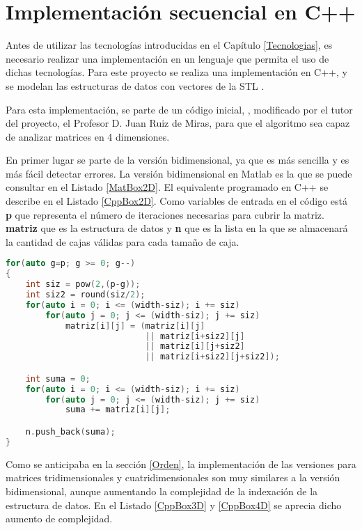 \chapter{Implementación secuencial en C++}
\label{Secuencial}
Antes de utilizar las tecnologías introducidas en el Capítulo \ref{Tecnologias}, es necesario realizar una implementación en un lenguaje que permita el uso de dichas tecnologías. Para este proyecto se realiza una implementación en C++, y se modelan las estructuras de datos con vectores de la STL \cite{unknown-author-no-dateH}.

Para esta implementación, se parte de un código inicial, \cite{unknown-author-2008}, modificado por el tutor del proyecto, el Profesor D. Juan Ruiz de Miras, para que el algoritmo sea capaz de analizar matrices en 4 dimensiones.



En primer lugar se parte de la versión bidimensional, ya que es más sencilla y es más fácil detectar errores. La versión bidimensional en Matlab es la que se puede consultar en el Listado \ref{MatBox2D}. El equivalente programado en C++ se describe en el Listado \ref{CppBox2D}. Como variables de entrada en el código está \textbf{p} que representa el número de iteraciones necesarias para cubrir la matriz. \textbf{matriz} que es la estructura de datos y \textbf{n} que es la lista en la que se almacenará la cantidad de cajas válidas para cada tamaño de caja.
\newpage
\begin{lstlisting}[language=C++,caption={Primera versión del Boxcount2D programado en C++},label=CppBox2D]
for(auto g=p; g >= 0; g--)
{
    int siz = pow(2,(p-g));
    int siz2 = round(siz/2);
    for(auto i = 0; i <= (width-siz); i += siz)
        for(auto j = 0; j <= (width-siz); j += siz)
            matriz[i][j] = (matriz[i][j] 
                            || matriz[i+siz2][j] 
                            || matriz[i][j+siz2] 
                            || matriz[i+siz2][j+siz2]);

    int suma = 0; 
    for(auto i = 0; i <= (width-siz); i += siz)
        for(auto j = 0; j <= (width-siz); j += siz)
            suma += matriz[i][j];

    n.push_back(suma);
}
\end{lstlisting}

\newpage

Como se anticipaba en la sección \ref{Orden}, la implementación de las versiones para matrices tridimensionales y cuatridimensionales son muy similares a la versión bidimensional, aunque aumentando la complejidad de la indexación de la estructura de datos. En el Listado \ref{CppBox3D} y \ref{CppBox4D} se aprecia dicho aumento de complejidad.

